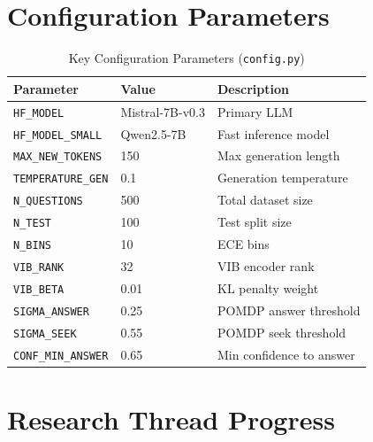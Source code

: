 \documentclass[conference]{IEEEtran}
\begin{document}
\appendix

\section{Configuration Parameters}
\label{app:config}

\begin{table}[H]
\centering
\caption{Key Configuration Parameters (\texttt{config.py})}
\label{tab:configparams}
\renewcommand{\arraystretch}{1.1}
\begin{tabular}{lll}
\toprule
\textbf{Parameter}            & \textbf{Value} & \textbf{Description} \\
\midrule
\texttt{HF\_MODEL}            & Mistral-7B-v0.3 & Primary LLM \\
\texttt{HF\_MODEL\_SMALL}     & Qwen2.5-7B      & Fast inference model \\
\texttt{MAX\_NEW\_TOKENS}     & 150             & Max generation length \\
\texttt{TEMPERATURE\_GEN}     & 0.1             & Generation temperature \\
\texttt{N\_QUESTIONS}         & 500             & Total dataset size \\
\texttt{N\_TEST}              & 100             & Test split size \\
\texttt{N\_BINS}              & 10              & ECE bins \\
\texttt{VIB\_RANK}            & 32              & VIB encoder rank \\
\texttt{VIB\_BETA}            & 0.01            & KL penalty weight \\
\texttt{SIGMA\_ANSWER}        & 0.25            & POMDP answer threshold \\
\texttt{SIGMA\_SEEK}          & 0.55            & POMDP seek threshold \\
\texttt{CONF\_MIN\_ANSWER}    & 0.65            & Min confidence to answer \\
\bottomrule
\end{tabular}
\end{table}

\section{Research Thread Progress}
\label{app:thread}
\end{document}

